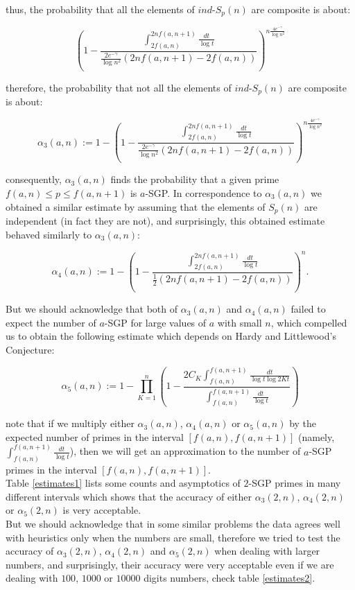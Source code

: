 \documentclass{amsart}
\numberwithin{equation}{section}
\begin{document}
thus, the probability that all the elements of $ind$-$S_p(n)$ are composite is about:

\[
{\left(1-\frac{\int_{2f(a,n)}^{2nf(a,n+1)} \frac{dt}{\log t}}{\frac{2e^{-\gamma}}{\log n^2} (2nf(a,n+1)-2f(a,n))}\right)}^{ n \frac{4e^{-\gamma}}{\log n^2}}
\]

therefore, the probability that not all the elements of $ind$-$S_p(n)$ are composite is about:

\[
\alpha_3(a,n):=1-{\left(1-\frac{\int_{2f(a,n)}^{2nf(a,n+1)} \frac{dt}{\log t}}{\frac{2e^{-\gamma}}{\log n^2} (2nf(a,n+1)-2f(a,n))}\right)}^{ n \frac{4e^{-\gamma}}{\log n^2}}
\]

consequently, $\alpha_3(a,n)$ finds the probability that a given prime $f(a,n) \leq p \leq f(a,n+1)$ is $a$-SGP. 
In correspondence to $\alpha_3(a,n)$ we obtained a similar estimate by assuming that the elements of $S_p(n)$ are independent (in fact they are not), and surprisingly, this obtained estimate behaved similarly to $\alpha_3(a,n)$: 

\[
\alpha_4(a,n):=1-{\left(1-\frac{\int_{2f(a,n)}^{2nf(a,n+1)} \frac{dt}{\log t}}{\frac{1}{2} (2nf(a,n+1)-2f(a,n))}\right)}^{n}.
\]

But we should acknowledge that both of $\alpha_3(a,n)$ and $\alpha_4(a,n)$ failed to expect the number of $a$-SGP for large values of $a$ with small $n$, which compelled us to obtain the following estimate which depends on Hardy and Littlewood's Conjecture:

\[
\alpha_5(a,n):=1- \displaystyle{\prod_{K=1}^{n}} \left(1-\frac{2C_K\int_{f(a,n)}^{f(a,n+1)} \frac{dt}{\log t \log 2Kt}}{\int_{f(a,n)}^{f(a,n+1)} \frac{dt}{\log t}}\right)
\]

note that if we multiply either $\alpha_3(a,n)$, $\alpha_4(a,n)$ or $\alpha_5(a,n)$  by the expected number of primes in the interval $[f(a,n) , f(a,n+1)]$ (namely, $\int_{f(a,n)}^{f(a,n+1)} \frac{dt}{\log t}$), then we will get an approximation to the number of $a$-SGP primes in the interval $[f(a,n) , f(a,n+1)]$.
\\
Table \ref{estimates1} lists some counts and asymptotics of $2$-SGP primes in many different intervals which shows that the accuracy of either $\alpha_3(2,n)$, $\alpha_4(2,n)$ or $\alpha_5(2,n)$ is very acceptable.\\
But we should acknowledge that in some similar problems the data agrees well with heuristics only when the numbers are small, therefore we tried to test the accuracy of $\alpha_3(2,n)$, $\alpha_4(2,n)$ and $\alpha_5(2,n)$ when dealing with larger numbers, and surprisingly, their accuracy were very acceptable even if we are dealing with $100$, $1000$ or $10000$ digits numbers, check table \ref{estimates2}.
\end{document}
